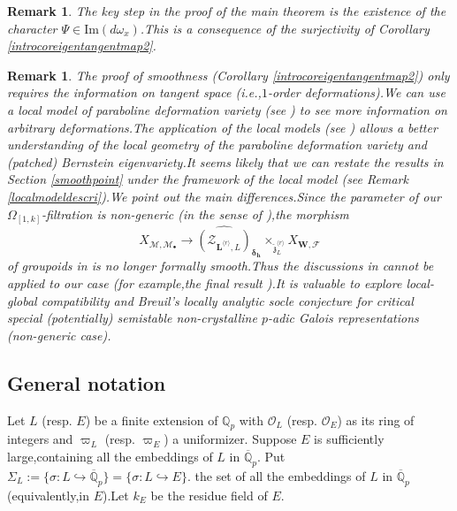 \documentclass[SecEq,CM,GP]{degruyter-crelle} %
\theoremstyle{plain}
\newtheorem{rmk}[thm]{Remark}
\newcommand{\bersteineigenvarpik}{{\mathcal{E}_{\omepik,\fp,\bm{\lambda}_\bh}^\infty(\overline{\rho})}}
\newcommand{\lrr}{{\langle r\rangle}}
\newcommand{\omepik}{\Omega_{[1,k]}}
\newcommand{\BQ}{{\mathbb{Q}}}
\newcommand{\bL}{{\mathbf{L}}}
\newcommand{\bW}{{\mathbf{W}}}
\newcommand{\bh}{{\mathbf{h}}}
\newcommand{\co}{\mathcal O}
\newcommand{\cM}{\mathcal M}
\newcommand{\cF}{\mathcal F}
\newcommand{\cZ}{\mathcal Z}
\newcommand{\fp}{{\mathfrak{p}}}
\newcommand{\fz}{{\mathfrak{z}}}
\begin{document}
\begin{rmk}The key step in the proof of the main theorem is the existence of the character  $\Psi\in \mathrm{Im}(d\omega_x)$.\;This is a  consequence of the surjectivity of Corollary \ref{introcoreigentangentmap2}.\;%
\end{rmk}
\begin{rmk}
The proof of smoothness (Corollary \ref{introcoreigentangentmap2}) only requires the information on tangent space (i.e.,$1$-order deformations).\;We can use a local model of paraboline deformation variety (see \cite[Section 6]{Ding2021}) to see more information on arbitrary deformations.\;The application of the local models (see \cite[Section 6]{Ding2021}) allows a better understanding of the local geometry of the paraboline deformation variety and (patched) Bernstein eigenvariety.\;It seems likely that we can restate the results in Section  \ref{smoothpoint} under the framework of the local model (see Remark \ref{localmodeldescri}).\;We point out the main differences.\;Since the parameter of our $\omepik$-filtration is non-generic (in the sense of \cite[(6.5)]{Ding2021}),\;the morphism
$$X_{\cM,\cM_{\bullet}}\rightarrow \widehat{(\cZ_{\bL^{\lrr},L})}_{\bm{\delta}_{\bh}}\times_{\widehat\fz^\lrr_{L}} X_{\bW,\cF}$$of groupoids in \cite[Theorem.6]{Ding2021} is no longer formally smooth.\;Thus the discussions in  \cite[Section 6.4]{Ding2021}  cannot be applied to our case (for example,\;the final result \cite[Corollary 6.4.7]{Ding2021}).\;It is valuable to explore local-global compatibility and Breuil's locally analytic socle conjecture \cite{breuil2016socle} for  critical special (potentially) semistable non-crystalline $p$-adic Galois representations (non-generic case).\;
\end{rmk}



\subsection{General notation}\label{notationger}
Let $L$ (resp. $E$) be a finite extension of $\BQ_p$ with $\co_L$ (resp. $\co_E$) as its ring of integers and $\varpi_L$ (resp. $\varpi_E$) a uniformizer. Suppose $E$ is sufficiently large,\;containing all the embeddings of $L$ in $\overline{\BQ}_p$. Put $\Sigma_L:=\{\sigma: L\hookrightarrow \overline{\BQ}_p\} =\{\sigma: L\hookrightarrow E\}.$ the set of all the embeddings of $L$ in $\overline{\BQ}_p$ (equivalently,\;in $E$).\;Let $k_E$ be the residue field of $E$.
\end{document}
